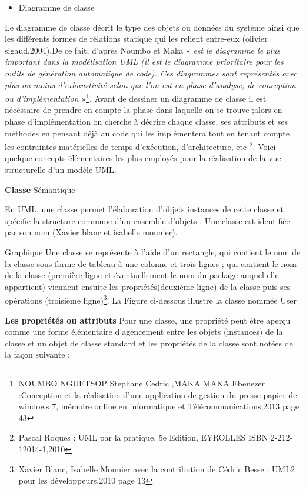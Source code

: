 \documentclass[a4paper, 12pt]{article}
\begin{document}
\begin{itemize}
\item Diagramme de classe
\end{itemize}

\quad Le diagramme de classe décrit le type des objets ou données du système ainsi que les différents formes de rélations statique qui les relient entre-eux (olivier sigaud,2004).De ce fait, d'après Noumbo et Maka «\textit{ est le diagramme le plus important dans la modélisation UML (il est le diagramme prioritaire pour les outils de génération automatique de code). Ces diagrammes sont représentés avec plus ou moins d’exhaustivité selon que l’on est en phase d’analyse, de conception ou d’implémentation} »\footnote{NOUMBO NGUETSOP Stephane Cedric ,MAKA MAKA Ebenezer :Conception et la réalisation d'une application de gestion du presse-papier de windows 7, mémoire  online en informatique et Télécommunications,2013 page 43}. Avant de dessiner un diagramme de classe il est nécéssaire de prendre en compte la phase dans laquelle on se trouve ;alors en phase d’implémentation on cherche à décrire chaque classe, ses attributs et ses méthodes en pensant déjà au code qui les implémentera tout en tenant compte les contraintes matérielles de temps d’exécution, d’architecture, etc \footnote{Pascal Roques : UML par la pratique, 5e Edition, EYROLLES ISBN 2-212-12014-1,2010}.
Voici quelque concepts élémentaires les plus employés 
pour la réalisation de la vue structurelle d’un modèle UML.

\textbf{Classe}
Sémantique

En UML, une classe  permet l'élaboration d’objets instances de cette classe et spécifie la structure commune d’un ensemble d’objets . Une classe est identifiée par son nom (Xavier blanc et isabelle mounier).

Graphique 
Une classe se représente à l’aide d’un rectangle, qui contient le nom de la classe sous forme de tableau à une colonne et trois lignes ; qui contient le nom de la classe (première ligne et
éventuellement le nom du package auquel elle appartient) viennent ensuite les propriétés(deuxième ligne) de la classe puis ses opérations (troisième ligne)\footnote{Xavier Blanc, Isabelle Mounier avec la contribution de Cédric Besse : UML2 pour les développeurs,2010 page 13}. La Figure ci-dessous illustre la classe nommée User

\textbf{Les propriétés ou attributs}
Pour une classe, une propriété peut être aperçu comme une forme élémentaire d’agencement entre les objets (instances) de la classe et un objet de classe standard et les propriétés de la classe sont notées de la façon suivante :
\end{document}
